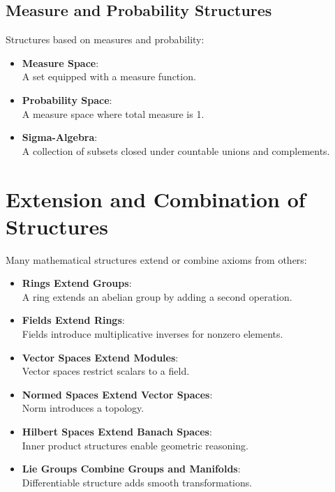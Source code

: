 \documentclass{article}
\begin{document}
\subsection{Measure and Probability Structures}
Structures based on measures and probability:
\begin{itemize}
    \item \textbf{Measure Space}: \\
        A set equipped with a measure function.
    \item \textbf{Probability Space}:\\ 
        A measure space where total measure is 1.
    \item \textbf{Sigma-Algebra}: \\
        A collection of subsets closed under countable 
        unions and complements.
\end{itemize}

\section{Extension and Combination of Structures}
Many mathematical structures extend or combine axioms from others:
\begin{itemize}
    \item \textbf{Rings Extend Groups}: \\  
        A ring extends an abelian group by adding a second operation.
    \item \textbf{Fields Extend Rings}: \\ 
        Fields introduce multiplicative inverses for nonzero elements.
    \item \textbf{Vector Spaces Extend Modules}: \\  
        Vector spaces restrict scalars to a field.
    \item \textbf{Normed Spaces Extend Vector Spaces}: \\ 
        Norm introduces a topology.
    \item \textbf{Hilbert Spaces Extend Banach Spaces}: \\ 
        Inner product structures enable geometric reasoning.
    \item \textbf{Lie Groups Combine Groups and Manifolds}: \\
        Differentiable structure adds smooth transformations.
\end{itemize}
\end{document}

